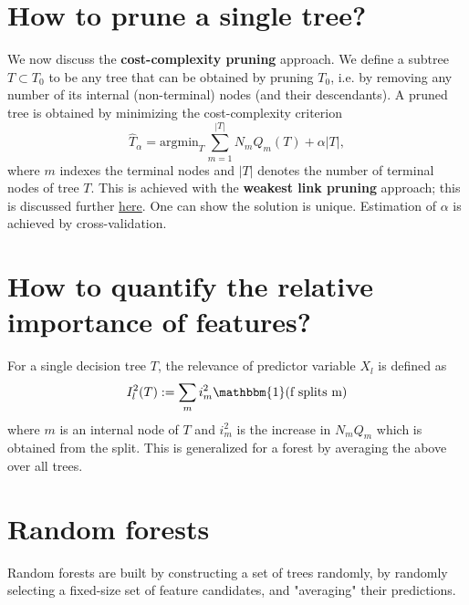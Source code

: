 \documentclass[]{article}
\begin{document}
\section{How to prune a single tree?}

\noindent We now discuss the \textbf{cost-complexity pruning} approach. We define a subtree $T\subset T_0$ to be any tree that can be obtained by pruning $T_0$, i.e. by removing any number of its internal (non-terminal) nodes (and their descendants). A pruned tree is obtained by minimizing the cost-complexity criterion
\begin{equation}
\hat{T}_\alpha = \textrm{argmin}_T \hspace{1pt} \sum_{m=1}^{|T|} N_m Q_m(T) + \alpha |T|,
\end{equation}
where $m$ indexes the terminal nodes and $|T|$ denotes the number of terminal nodes of tree $T$. This is achieved with the \textbf{weakest link pruning} approach; this is discussed further \href{https://online.stat.psu.edu/stat508/lesson/11/11.8/11.8.2}{here}. One can show the solution is unique. Estimation of $\alpha$ is achieved by cross-validation.

\section{How to quantify the relative importance of features?}

For a single decision tree $T$, the relevance of predictor variable $X_l$ is defined as
\begin{equation}
I_l^2(T):= \sum_m i^2_m \mathbbm{1}(\textrm{f splits m})
\end{equation}
where $m$ is an internal node of $T$ and $i^2_m$ is the increase in $N_mQ_m$ which is obtained from the split. This is generalized for a forest by averaging the above over all trees.

\section{Random forests}

Random forests are built by constructing a set of trees randomly, by randomly selecting a fixed-size set of feature candidates, and "averaging" their predictions. 
\end{document}
